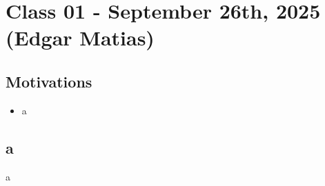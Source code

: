 \documentclass[../stationary_ifs.tex]{subfiles}
\begin{document}
\section{Class 01 - September 26th, 2025 (Edgar Matias)}
\subsection{Motivations}
\begin{itemize}
	\item a
\end{itemize}
\subsection{a}
a
\end{document}
